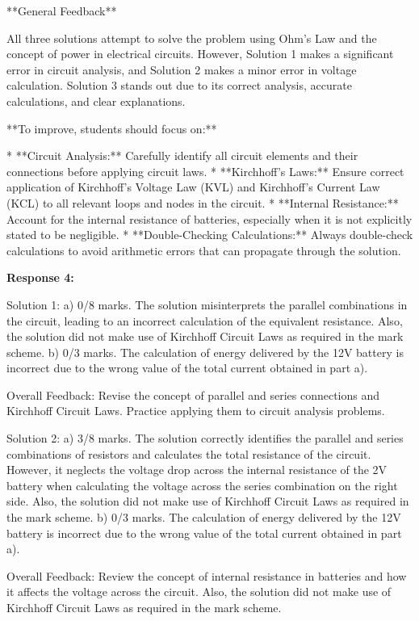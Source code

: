 \documentclass[a4paper,11pt]{article}
\begin{document}
**General Feedback**

All three solutions attempt to solve the problem using Ohm's Law and the concept of power in electrical circuits. However, Solution 1 makes a significant error in circuit analysis, and Solution 2 makes a minor error in voltage calculation. Solution 3 stands out due to its correct analysis, accurate calculations, and clear explanations.

**To improve, students should focus on:**

* **Circuit Analysis:** Carefully identify all circuit elements and their connections before applying circuit laws.
* **Kirchhoff's Laws:**  Ensure correct application of Kirchhoff's Voltage Law (KVL) and Kirchhoff's Current Law (KCL) to all relevant loops and nodes in the circuit.
* **Internal Resistance:** Account for the internal resistance of batteries, especially when it is not explicitly stated to be negligible.
* **Double-Checking Calculations:** Always double-check calculations to avoid arithmetic errors that can propagate through the solution.

\textbf{Response 4:}

Solution 1:
a) 0/8 marks. The solution misinterprets the parallel combinations in the circuit, leading to an incorrect calculation of the equivalent resistance. Also, the solution did not make use of Kirchhoff Circuit Laws as required in the mark scheme.
b) 0/3 marks. The calculation of energy delivered by the 12V battery is incorrect due to the wrong value of the total current obtained in part a). 

Overall Feedback: Revise the concept of parallel and series connections and Kirchhoff Circuit Laws. Practice applying them to circuit analysis problems.

Solution 2:
a) 3/8 marks. The solution correctly identifies the parallel and series combinations of resistors and calculates the total resistance of the circuit. However, it neglects the voltage drop across the internal resistance of the 2V battery when calculating the voltage across the series combination on the right side. Also, the solution did not make use of Kirchhoff Circuit Laws as required in the mark scheme.
b) 0/3 marks. The calculation of energy delivered by the 12V battery is incorrect due to the wrong value of the total current obtained in part a).

Overall Feedback: Review the concept of internal resistance in batteries and how it affects the voltage across the circuit. Also, the solution did not make use of Kirchhoff Circuit Laws as required in the mark scheme.
\end{document}
